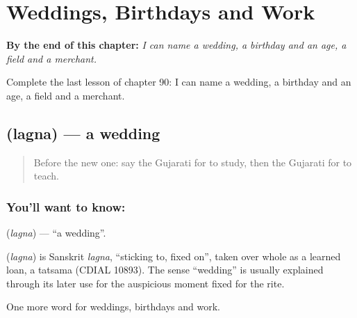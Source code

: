 
\chapter{Weddings, Birthdays and Work}
\label{ch:gu-weddings-birthdays-and-work}

\begin{chapteropening}
\textbf{By the end of this chapter:} \emph{I can name a wedding, a birthday and an age, a field and a merchant.}

Complete the last lesson of chapter 90: I can name a wedding, a birthday and an age, a field and a merchant.
\end{chapteropening}

\section[\texorpdfstring{\gu{લગ્ન} (lagna)}{લગ્ન (lagna)}]{ (lagna) — a wedding}

\label{lesson:GU-C90-wedding}



\begin{quote}
Before the new one: say the Gujarati for to study, then the Gujarati for to teach.
\end{quote}

\subsection*{You'll want to know: }
\textbf{} (\emph{lagna}) — \textquotedblleft{}a wedding\textquotedblright{}.

\begin{cousinweb}
\textbf{} (\emph{lagna}) is Sanskrit \emph{lagna}, \textquotedblleft{}sticking to, fixed on\textquotedblright{}, taken over whole as a learned loan, a tatsama (CDIAL 10893). The sense \textquotedblleft{}wedding\textquotedblright{} is usually explained through its later use for the auspicious moment fixed for the rite.
\end{cousinweb}

\begin{grammarlens}[title={What you've built}]
One more word for weddings, birthdays and work.
\end{grammarlens}

